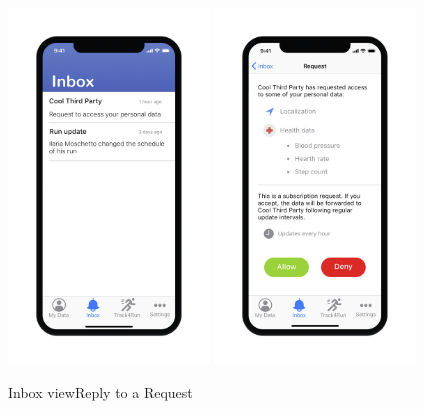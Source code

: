 \includegraphics[width=0.4\textwidth]{rasdL/Pictures/Mockup/mobile/inbox.png}%
\includegraphics[width=0.4\textwidth]{rasdL/Pictures/Mockup/mobile/request_received.png}

\hspace*{1,6cm}Inbox view\hspace*{3,6cm}Reply to a Request


